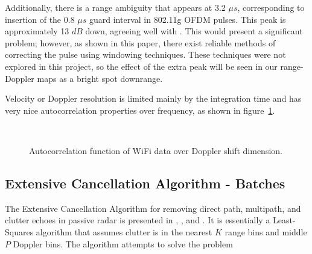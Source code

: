 \documentclass[article,11pt,onecolumn,final]{IEEEtran}
\begin{document}
Additionally, there is a range ambiguity that appears at 3.2 $\mu s$, corresponding to insertion of the 0.8 $\mu s$ guard interval in 802.11g OFDM pulses. This peak is approximately 13 $dB$ down, agreeing well with \cite{Colone2012}. This would present a significant problem; however, as shown in this paper, there exist reliable methods of correcting the pulse using windowing techniques. These techniques were not explored in this project, so the effect of the extra peak will be seen in our range-Doppler maps as a bright spot downrange.

Velocity or Doppler resolution is limited mainly by the integration time and has very nice autocorrelation properties over frequency, as shown in figure~\ref{fig:autocorrdopp}.

\begin{figure}
	\caption{Autocorrelation function of WiFi data over Doppler shift dimension.}
	\centering
	\includegraphics[width=0.5]{figures/autocorrdopp.png}
	\label{fig:autocorrdopp}
\end{figure}

\subsection{Extensive Cancellation Algorithm - Batches}

The Extensive Cancellation Algorithm for removing direct path, multipath, and clutter echoes in passive radar is presented in \cite{Colone2006}, \cite{Colone2009}, and \cite{Colone2012}. It is essentially a Least-Squares algorithm that assumes clutter is in the nearest $K$ range bins and middle $P$ Doppler bins. The algorithm attempts to solve the problem
\end{document}
